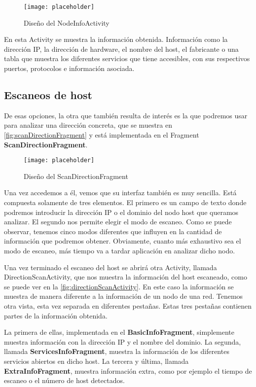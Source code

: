 \begin{figure}[H] %
	\centering
	\texttt{[image: placeholder]}
	\caption{Diseño del NodeInfoActivity}
	\label{fig:nodeInfoActivity}
\end{figure}

En esta Activity se muestra la información obtenida. Información como la dirección IP,  la dirección de hardware, el nombre del host, el fabricante o una tabla que muestra los diferentes servicios que tiene accesibles, con sus respectivos puertos, protocolos e información asociada.

\subsection{Escaneos de host}

De esas opciones, la otra que también resulta de interés es la que podremos usar para analizar una dirección concreta, que se muestra en \autoref{fig:scanDirectionFragment} y está implementada en el Fragment \textbf{ScanDirectionFragment}.

\begin{figure}[H] %
	\centering
	\texttt{[image: placeholder]}
	\caption{Diseño del ScanDirectionFragment}
	\label{fig:scanDirectionFragment}
\end{figure}

Una vez accedemos a él, vemos que su interfaz también es muy sencilla. Está compuesta solamente de tres elementos. El primero es un campo de texto donde podremos introducir la dirección IP o el dominio del nodo host que queramos analizar. El segundo nos permite elegir el modo de escaneo. Como se puede observar, tenemos cinco modos diferentes que influyen en la cantidad de información que podremos obtener. Obviamente, cuanto más exhaustivo sea el modo de escaneo, más tiempo va a tardar aplicación en analizar dicho nodo.

Una vez terminado el escaneo del host se abrirá otra Activity, llamada DirectionScanActivity,  que nos muestra la información del host escaneado, como se puede ver en la \autoref{fig:directionScanActivity}. En este caso la información se muestra de manera diferente a la información de un nodo de una red. Tenemos otra vista, esta vez separada en diferentes pestañas. Estas tres pestañas contienen partes de la información obtenida.

La primera de ellas, implementada en el \textbf{BasicInfoFragment}, simplemente muestra información con la dirección IP y el nombre del dominio. La segunda, llamada \textbf{ServicesInfoFragment}, muestra la información de los diferentes servicios abiertos en dicho host. La tercera y última, llamada \textbf{ExtraInfoFragment}, muestra información extra, como por ejemplo el tiempo de escaneo o el número de host detectados.

